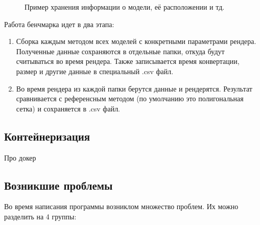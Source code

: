 \documentclass[a4paper,hidelinks,12pt]{article}
\begin{document}
\newpage

\begin{figure}[h]
  \centering
  \caption{Пример хранения информации о модели, её расположении и тд.}
  \label{fig:my_label}
\end{figure}

Работа бенчмарка идет в два этапа:
\begin{enumerate}
	\item Сборка каждым методом всех моделей с конкретными параметрами рендера. Полученные данные сохраняются в отдельные папки, откуда будут считываться во время рендера. Также записывается 
	время конвертации, размер и другие данные в специальный .csv файл.
	\item Во время рендера из каждой папки берутся данные и рендерятся. Результат сравнивается с референсным методом (по умолчанию это полигональная сетка) и сохраняется в .csv файл.
\end{enumerate}

\subsection{Контейнеризация}

Про докер

\subsection{Возникшие проблемы}

Во время написания программы возниклом множество проблем. Их можно разделить на 4 группы:
\end{document}
